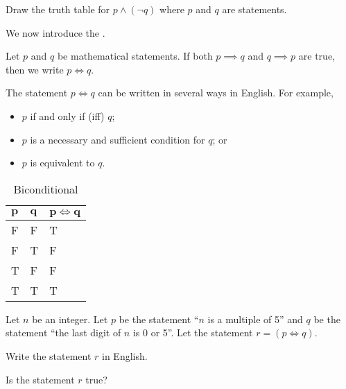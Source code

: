 \begin{exercise}\label{exercise-negation-of-implication}
    Draw the truth table for $p \land (\lnot q)$ where $p$ and $q$ are statements.
\end{exercise}

We now introduce the .
\begin{definition}
    Let $p$ and $q$ be mathematical statements. If both $p \implies q$ and $q \implies p$ are true, then we write $p \iff q$.
\end{definition}

\begin{remark}
    The statement $p \iff q$ can be written in several ways in English. For example,
    \begin{itemize}
        \item $p$ if and only if (iff) $q$;
        \item $p$ is a necessary and sufficient condition for $q$; or
        \item $p$ is equivalent to $q$.
    \end{itemize}
\end{remark}

\newpage

\begin{table}[h]
    \centering
    \begin{tabular}{|l|l||l|}
        \hline
        $\boldsymbol{p}$ & $\boldsymbol{q}$ & $\boldsymbol{p \iff q}$ \\ \hline
        F & F & T \\ \hline
        F & T & F \\ \hline
        T & F & F \\ \hline
        T & T & T \\ \hline
    \end{tabular}
    \caption{Biconditional}
\end{table}

\begin{exercise}
    Let $n$ be an integer. Let $p$ be the statement ``$n$ is a multiple of 5'' and $q$ be the statement ``the last digit of $n$ is 0 or 5''. Let the statement $r = (p \iff q)$.
    \begin{partquestions}{\roman*}
        \item Write the statement $r$ in English.
        \item Is the statement $r$ true?
    \end{partquestions}
\end{exercise}

